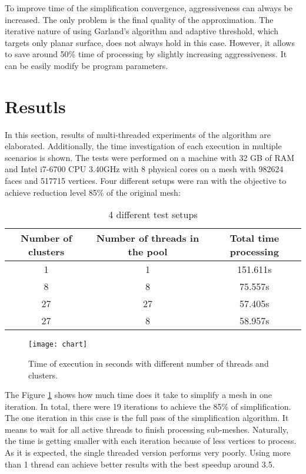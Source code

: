 To improve time of the simplification convergence, aggressiveness can always be increased. The only problem is the final quality of the approximation. The iterative nature of using Garland's algorithm and adaptive threshold, which targets only planar surface, does not always hold in this case. However, it allows to save around 50\% time of processing by slightly increasing aggressiveness. It can be easily modify be program parameters.

\newpage
\section{Resutls}

In this section, results of multi-threaded experiments of the algorithm are elaborated. Additionally, the time investigation of each execution in multiple scenarios is shown. The tests were performed on a machine with 32 GB of RAM and Intel i7-6700 CPU 3.40GHz with 8 physical cores on a mesh with 982624 faces and 517715 vertices. Four different setups were ran with the objective to achieve reduction level 85\% of the original mesh:

\begin{table}[h!]
\centering
\begin{tabular}{ |c|c|c| } 
 \hline
 Number of clusters & Number of threads in the pool & Total time processing\\
 \hline
 1 & 1 & 151.611s\\ 
 8 & 8 & 75.557s\\ 
 27 & 27 & 57.405s\\
 27 & 8 & 58.957s\\
 \hline
\end{tabular}
\caption{4 different test setups}
\end{table}

\begin{figure}[h!]
  \begin{center}
    \texttt{[image: chart]}
    \caption{Time of execution in seconds with different number of threads and clusters.}
    \label{fig:execution_time}
  \end{center}
\end{figure}

The Figure \ref{fig:execution_time} shows how much time does it take to simplify a mesh in one iteration. In total, there were 19 iterations to achieve the 85\% of simplification. The one iteration in this case is the full pass of the simplification algorithm. It means to wait for all active threads to finish processing sub-meshes. Naturally, the time is getting smaller with each iteration because of less vertices to process. As it is expected, the single threaded version performs very poorly. Using more than 1 thread can achieve better results with the best speedup around 3.5.

